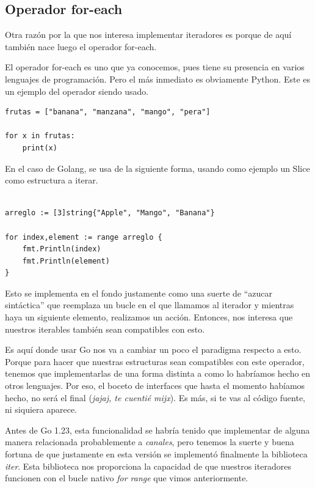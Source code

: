 \documentclass[11pt]{article}
\begin{document}
\subsection{Operador for-each}
\label{sec:org24b2505}

Otra razón por la que nos interesa implementar iteradores es porque de aquí también nace luego el operador for-each.

El operador for-each es uno que ya conocemos, pues tiene su presencia en varios lenguajes de programación. Pero el más inmediato es obviamente Python. Este es un ejemplo del operador siendo usado.

\begin{verbatim}
frutas = ["banana", "manzana", "mango", "pera"]

for x in frutas:
    print(x)
\end{verbatim}

En el caso de Golang, se usa de la siguiente forma, usando como ejemplo un Slice como estructura a iterar.
\begin{verbatim}

arreglo := [3]string{"Apple", "Mango", "Banana"}

for index,element := range arreglo {
	fmt.Println(index)
	fmt.Println(element)
}

\end{verbatim}

Esto se implementa en el fondo justamente como una suerte de ``azucar sintáctica'' que reemplaza un bucle en el que llamamos al iterador y mientras haya un siguiente elemento, realizamos un acción. Entonces, nos interesa que nuestros iterables también sean compatibles con esto.

Es aquí donde usar Go nos va a cambiar un poco el paradigma respecto a esto. Porque para hacer que nuestras estructuras sean compatibles con este operador, tenemos que implementarlas de una forma distinta a como lo habríamos hecho en otros lenguajes. Por eso, el boceto de interfaces que hasta el momento habíamos hecho, no será el final (\emph{jajaj, te cuentié mijx}). Es más, si te vas al código fuente, ni siquiera aparece.

Antes de Go 1.23, esta funcionalidad se habría tenido que implementar de alguna manera relacionada probablemente a \emph{canales}, pero tenemos la suerte y buena fortuna de que justamente en esta versión se implementó finalmente la biblioteca \emph{iter}. Esta biblioteca nos proporciona la capacidad de que nuestros iteradores funcionen con el bucle nativo \emph{for range} que vimos anteriormente.
\end{document}
